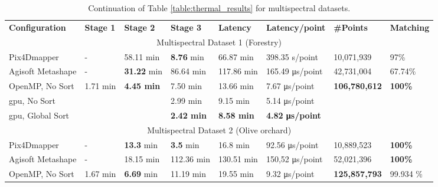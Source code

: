 \renewcommand{\arraystretch}{1.3}
\begin{table}
    \centering
    \footnotesize
    \caption{Continuation of Table \ref{table:thermal_results} for multispectral datasets. }
    \label{table:multispectral_results}
    \begin{tabular}{l@{\hskip 0.06in}|lll|l|l|l|l}
    \toprule
    \textbf{Configuration} & \textbf{Stage 1} & \textbf{Stage 2} & \textbf{Stage 3} & \textbf{Latency} & \textbf{Latency/point} & \textbf{\#Points} & \textbf{Matching}\\
    \cmidrule{1-8}
    \multicolumn{8}{c}{Multispectral Dataset 1 (Forestry)}\\
    \cmidrule{1-8}
    Pix4Dmapper & - & 58.11 \si{\minute} & \textbf{8.76} \si{\minute} & 66.87 \si{\minute} & 398.35 \si{\second}/point & 10,071,939 & 97\%\\
    Agisoft Metashape & - & \textbf{31.22} \si{\minute} & 86.64 \si{\minute} & 117.86 \si{\minute} & 165.49 \si{\micro\second}/point & 42,731,004 & 67.74\%\\
    \cmidrule{1-8}
    OpenMP, No Sort & \multirow{\numExperiments}{*}{1.71 \si{\minute}} & \multirow{\numExperiments}{*}{\textbf{4.45 \si{\minute}}} & 7.50 \si{\minute} & 13.66 \si{\minute} & 7.67 \si{\micro\second}/point & \multirow{\numExperiments}{*}{\textbf{106,780,612}} & \multirow{\numExperiments}{*}{\textbf{100\%}}\\
    \acrshort{gpu}, No Sort & & & 2.99 \si{\minute} & 9.15 \si{\minute} & 5.14 \si{\micro\second}/point & &\\
    \acrshort{gpu}, Global Sort & & & \textbf{2.42 \si{\minute}} & \textbf{8.58 \si{\minute}} & \textbf{4.82 \si{\micro\second}/point} & &\\
    \bottomrule
    \toprule
    \multicolumn{8}{c}{Multispectral Dataset 2 (Olive orchard)}\\
    \cmidrule{1-8}
    Pix4Dmapper & - & \textbf{13.3} \si{\minute} & \textbf{3.5} \si{\minute} & 16.8 \si{\minute} & 92.56 \si{\micro\second}/point & 10,889,523 & \textbf{100\%}\\
    Agisoft Metashape & - & 18.15 \si{\minute} & 112.36 \si{\minute} & 130.51 \si{\minute} & 150,52 \si{\micro\second}/point & 52,021,396 & \textbf{100\%}\\
    \cmidrule{1-8}
    OpenMP, No Sort & \multirow{\numExperiments}{*}{1.67 \si{\minute}} & \multirow{\numExperiments}{*}{\textbf{6.69} \si{\minute}} & 11.19 \si{\minute} & 19.55 \si{\minute} & 9.32 \si{\micro\second}/point & \multirow{\numExperiments}{*}{\textbf{125,857,793}} & \multirow{\numExperiments}{*}{99.934 \%}\\

\end{tabular}
\end{table}
